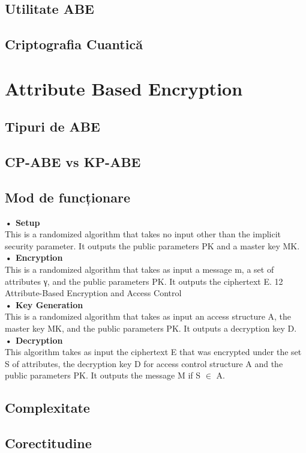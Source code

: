 \documentclass{article}
\begin{document}
\subsection{Utilitate ABE}
\subsection{Criptografia Cuantică}
\section{Attribute Based Encryption}
\subsection{Tipuri de ABE}
\subsection{CP-ABE vs KP-ABE}
\subsection{Mod de funcționare}
\textbf{• Setup} \\ This is a randomized algorithm that takes no input other than the
implicit security parameter. It outputs the public parameters PK and a master key MK.
\\\textbf{• Encryption}\\ This is a randomized algorithm that takes as input a message
m, a set of attributes γ, and the public parameters PK. It outputs the ciphertext E.
12 Attribute-Based Encryption and Access Control
\\\textbf{• Key Generation}\\ This is a randomized algorithm that takes as input an
access structure A, the master key MK, and the public parameters PK. It
outputs a decryption key D.
\\\textbf{• Decryption}\\ This algorithm takes as input the ciphertext E that was
encrypted under the set S of attributes, the decryption key D for access control structure A and the public parameters PK. It outputs the message M if
S $\in$ A.
\subsection{Complexitate}
\subsection{Corectitudine}
\end{document}
